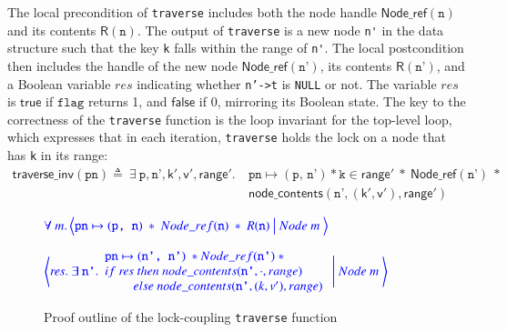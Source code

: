 \documentclass[a4paper,UKenglish,cleveref, autoref, thm-restate]{lipics-v2021}
\newcommand{\treerep}{\ensuremath{\mathsf{Node}}}
\newcommand{\nodeboxrep}{\ensuremath{\mathsf{Node\_ref}}}
\begin{document}
The local precondition of \lstinline{traverse} includes both the node handle $\nodeboxrep(\texttt{n})$ and its contents $\mathsf{R}(\texttt{n})$. The output of \lstinline{traverse} is a new node \lstinline{n'} in the data structure such that the key \texttt{k} falls within the range of \lstinline{n'}. The local postcondition then includes the handle of the new node $\nodeboxrep(\texttt{n'})$, its contents $\mathsf{R}(\texttt{n'})$, and a Boolean variable $\mathit{res}$ indicating whether \texttt{n'->t} is \texttt{NULL} or not. The variable $\mathit{res}$ is $\mathsf{true}$ if $\texttt{flag}$ returns 1, and $\mathsf{false}$ if 0, mirroring its Boolean state. The key to the correctness of the \texttt{traverse} function is the loop invariant for the top-level loop, which expresses that in each iteration, \lstinline{traverse} holds the lock on a node that has \lstinline{k} in its range:
\begin{align*}\mathsf{traverse\_inv}(\texttt{pn}) \triangleq\ \exists \ \texttt{p}, \texttt{n'}, \mathsf{k'}, \mathsf{v'}, \mathsf{range'}.\ &\texttt{pn} \mapsto (\texttt{p, n'}) \ast \texttt{k} \in \mathsf{range'}\ \ast \  \nodeboxrep(\texttt{n'})  \ \ast \\  &\mathsf{node\_contents}(\texttt{n'}, (\mathsf{k'}, \mathsf{v'}), \mathsf{range'})
\end{align*}

\begin{figure}[!ht]
	$\color{blue}
	\forall \  m. \left\langle \texttt{pn} \mapsto (\texttt{p, n}) \ \ast \ 
	\nodeboxrep(\texttt{n})  \ \ast \ \mathsf{R}(\texttt{n}) \ \big| \ \treerep\ m \
	\right\rangle$
		
	$\color{blue}
	\left\langle \mathit{res}. \ \exists \  \texttt{n'}.
	\begin{array}{l} \texttt{pn} \mapsto (\texttt{n', n'}) \ \ast \nodeboxrep(\texttt{n'}) \ \ast \ 
		\\ 
		\mathsf{if} \ \mathit{res} \ \mathsf{then} \ \mathsf{node\_contents}(\texttt{n'}, \cdot, \mathsf{range}) \ 
		\\ \ \ \ \ \ \ \ \ \ \mathsf{else} \ \mathsf{node\_contents}(\texttt{n'}, (\mathsf{k}, \mathsf{v'}), \mathsf{range})
	\end{array}
	\ \Bigg| \ \treerep\ m \
	\right\rangle$
	\caption{Proof outline of the lock-coupling \texttt{traverse} function}
	\label{proof_lock_traverse}
\end{figure}
\end{document}
